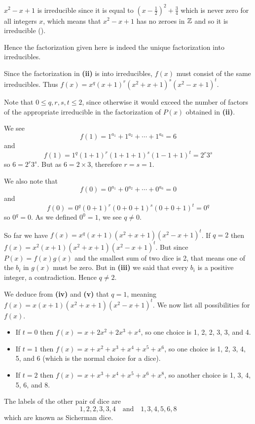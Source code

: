 \begin{questions}
\begin{partquestions}{\roman*}
        $x^2-x+1$ is irreducible since it is equal to $(x-\frac12)^2 + \frac34$ which is never zero for all integers $x$, which means that $x^2-x+1$ has no zeroes in $\mathbb{Z}$ and so it is irreducible ().

        Hence the factorization given here is indeed the unique factorization into irreducibles.
        
        \item Since the factorization in \textbf{(ii)} is into irreducibles, $f(x)$ must consist of the same irreducibles. Thus $f(x) = x^q(x+1)^r(x^2+x+1)^s(x^2-x+1)^t$.
        
        Note that $0 \leq q,r,s,t \leq 2$, since otherwise it would exceed the number of factors of the appropriate irreducible in the factorization of $P(x)$ obtained in \textbf{(ii)}.
        
        \item We see
        \[
            f(1) = 1^{a_1} + 1^{a_2} + \cdots + 1^{a_6} = 6
        \]
        and
        \[
            f(1) = 1^q(1+1)^r(1+1+1)^s(1-1+1)^t = 2^r3^s
        \]
        so $6 = 2^r3^s$. But as $6 = 2 \times 3$, therefore $r = s = 1$.

        We also note that
        \[
            f(0) = 0^{a_1} + 0^{a_2} + \cdots + 0^{a_6} = 0
        \]
        and
        \[
            f(0) = 0^q(0+1)^r(0+0+1)^s(0+0+1)^t = 0^q
        \]
        so $0^q = 0$. As we defined $0^0 = 1$, we see $q \neq 0$.
        
        \item So far we have $f(x) = x^q(x+1)(x^2+x+1)(x^2-x+1)^t$. If $q = 2$ then $f(x) = x^2(x+1)(x^2+x+1)(x^2-x+1)^t$. But since $P(x) = f(x)g(x)$ and the smallest sum of two dice is 2, that means one of the $b_i$ in $g(x)$ must be zero. But in \textbf{(iii)} we said that every $b_i$ is a positive integer, a contradiction. Hence $q \neq 2$.
        
        \item We deduce from \textbf{(iv)} and \textbf{(v)} that $q = 1$, meaning $f(x) = x(x+1)(x^2+x+1)(x^2-x+1)^t$. We now list all possibilities for $f(x)$.
        \begin{itemize}
            \item If $t = 0$ then $f(x) = x + 2x^2 + 2x^3 + x^4$, so one choice is 1, 2, 2, 3, 3, and 4.
            \item If $t = 1$ then $f(x) = x + x^2 + x^3 + x^4 + x^5 + x^6$, so one choice is 1, 2, 3, 4, 5, and 6 (which is the normal choice for a dice).
            \item If $t = 2$ then $f(x) = x + x^3 + x^4 + x^5 + x^6 + x^8$, so another choice is 1, 3, 4, 5, 6, and 8.
        \end{itemize}
        
        \item The labels of the other pair of dice are
        \[
            1,2,2,3,3,4 \quad\text{and}\quad 1,3,4,5,6,8
        \]
        which are known as Sicherman dice.
    \end{partquestions}
\end{questions}
